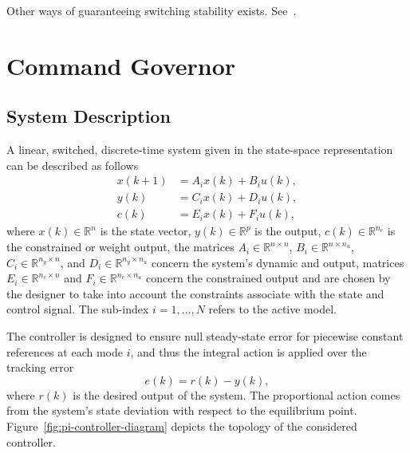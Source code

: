Other ways of guaranteeing switching stability exists.
See~\textcite{geromel.deaecto:stability,liberzon.morse:basic,geromel.colaneri:stabilization}.

\section{Command Governor}%
\label{sec:command-governor}

\subsection{System Description}%
\label{subsec:system-description}

A linear, switched, discrete-time system given in the state-space representation
can be described as follows
%
\begin{equation}
  \label{eq:state-space}
  \begin{aligned}
    x(k+1) & = A_{i}x(k)+B_{i}u(k), \\
    y(k)   & = C_{i}x(k)+D_{i}u(k), \\
    c(k)   & = E_{i}x(k)+F_{i}u(k),
  \end{aligned}
\end{equation}
%
where \(x(k)\in\mathbb{R}^n\) is the state vector, \(y(k)\in\mathbb{R}^p\) is the
output, \(c(k)\in\mathbb{R}^{n_c}\) is the constrained or weight output, the
matrices \(A_{i}\in\mathbb{R}^{n\times{}n}\), \(B_{i}\in\mathbb{R}^{n\times{}n_u}\),
\(C_{i}\in\mathbb{R}^{n_y\times{}n}\), and \(D_{i}\in\mathbb{R}^{n_y\times{}n_u}\) concern the
system's dynamic and output, matrices \(E_{i}\in\mathbb{R}^{n_c\times{}n}\) and
\(F_{i}\in\mathbb{R}^{n_c\times{}n_u}\) concern the constrained output and are chosen
by the designer to take into account the constraints associate with the state
and control signal. The sub-index \(i = 1,\ldots,N\) refers to the active model.

The controller is designed to ensure null steady-state error for piecewise
constant references at each mode \(i\), and thus the integral action is applied
over the tracking error~\parencite{lopes.leite.ea:anti-windup}
%
\begin{equation}
  \label{eq:r-y-error}
  e(k) = r(k)-y(k),
\end{equation}
%
where \(r(k)\) is the desired output of the system. The proportional action
comes from the system's state deviation with respect to the equilibrium point.
Figure~\ref{fig:pi-controller-diagram} depicts the topology of the considered
controller.

